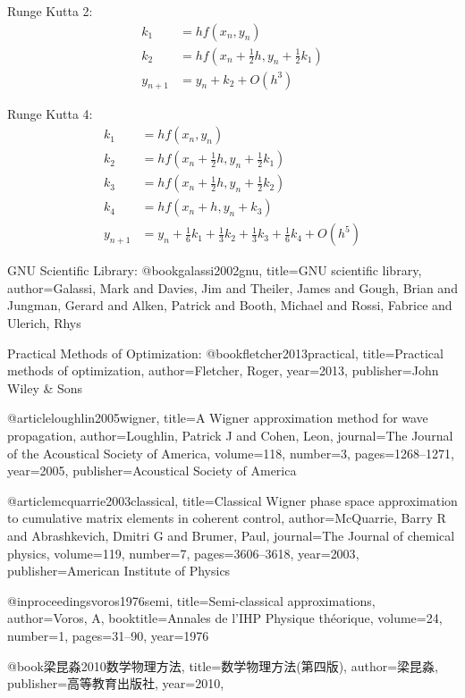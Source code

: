 Runge Kutta 2:
\begin{equation}\begin{aligned}
k_{1} &=h f\left(x_{n}, y_{n}\right) \\
k_{2} &=h f\left(x_{n}+\frac{1}{2} h, y_{n}+\frac{1}{2} k_{1}\right) \\
y_{n+1} &=y_{n}+k_{2}+O\left(h^{3}\right)
\end{aligned}\end{equation}

Runge Kutta 4:
\begin{equation}\begin{aligned}
k_{1} &=h f\left(x_{n}, y_{n}\right) \\
k_{2} &=h f\left(x_{n}+\frac{1}{2} h, y_{n}+\frac{1}{2} k_{1}\right) \\
k_{3} &=h f\left(x_{n}+\frac{1}{2} h, y_{n}+\frac{1}{2} k_{2}\right) \\
k_{4} &=h f\left(x_{n}+h, y_{n}+k_{3}\right) \\
y_{n+1} &=y_{n}+\frac{1}{6} k_{1}+\frac{1}{3} k_{2}+\frac{1}{3} k_{3}+\frac{1}{6} k_{4}+O\left(h^{5}\right)
\end{aligned}\end{equation}

GNU Scientific Library:
@book{galassi2002gnu,
  title={GNU scientific library},
  author={Galassi, Mark and Davies, Jim and Theiler, James and Gough, Brian and Jungman, Gerard and Alken, Patrick and Booth, Michael and Rossi, Fabrice and Ulerich, Rhys}
}

Practical Methods of Optimization:
@book{fletcher2013practical,
  title={Practical methods of optimization},
  author={Fletcher, Roger},
  year={2013},
  publisher={John Wiley \& Sons}
}

@article{loughlin2005wigner,
  title={A Wigner approximation method for wave propagation},
  author={Loughlin, Patrick J and Cohen, Leon},
  journal={The Journal of the Acoustical Society of America},
  volume={118},
  number={3},
  pages={1268--1271},
  year={2005},
  publisher={Acoustical Society of America}
}

@article{mcquarrie2003classical,
  title={Classical Wigner phase space approximation to cumulative matrix elements in coherent control},
  author={McQuarrie, Barry R and Abrashkevich, Dmitri G and Brumer, Paul},
  journal={The Journal of chemical physics},
  volume={119},
  number={7},
  pages={3606--3618},
  year={2003},
  publisher={American Institute of Physics}
}

@inproceedings{voros1976semi,
  title={Semi-classical approximations},
  author={Voros, A},
  booktitle={Annales de l'IHP Physique th{\'e}orique},
  volume={24},
  number={1},
  pages={31--90},
  year={1976}
}

@book{梁昆淼2010数学物理方法,
  title={数学物理方法(第四版)},
  author={梁昆淼},
  publisher={高等教育出版社},
  year={2010},
}